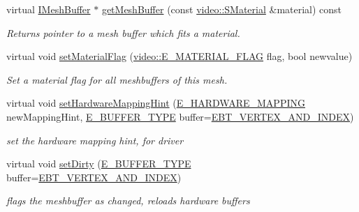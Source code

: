 \begin{DoxyCompactItemize}
virtual \hyperlink{classirr_1_1scene_1_1IMeshBuffer}{I\+Mesh\+Buffer} $\ast$ \hyperlink{structirr_1_1scene_1_1SAnimatedMesh_a3c010c881f315e56a05f40632f3c7f79}{get\+Mesh\+Buffer} (const \hyperlink{classirr_1_1video_1_1SMaterial}{video\+::\+S\+Material} \&material) const
\begin{DoxyCompactList}\small\item\em Returns pointer to a mesh buffer which fits a material. \end{DoxyCompactList}\item 
\mbox{\label{structirr_1_1scene_1_1SAnimatedMesh_aefe38066b9c38c6d4ea522b5d988769e}} 
virtual void \hyperlink{structirr_1_1scene_1_1SAnimatedMesh_aefe38066b9c38c6d4ea522b5d988769e}{set\+Material\+Flag} (\hyperlink{namespaceirr_1_1video_a8a3bc00ae8137535b9fbc5f40add70d3}{video\+::\+E\+\_\+\+M\+A\+T\+E\+R\+I\+A\+L\+\_\+\+F\+L\+AG} flag, bool newvalue)
\begin{DoxyCompactList}\small\item\em Set a material flag for all meshbuffers of this mesh. \end{DoxyCompactList}\item 
\mbox{\label{structirr_1_1scene_1_1SAnimatedMesh_a69448fa91bd1c6316d11d9ae3b8b88e6}} 
virtual void \hyperlink{structirr_1_1scene_1_1SAnimatedMesh_a69448fa91bd1c6316d11d9ae3b8b88e6}{set\+Hardware\+Mapping\+Hint} (\hyperlink{namespaceirr_1_1scene_ac7d8ee8d77da75f2580bb9bb17231c27}{E\+\_\+\+H\+A\+R\+D\+W\+A\+R\+E\+\_\+\+M\+A\+P\+P\+I\+NG} new\+Mapping\+Hint, \hyperlink{namespaceirr_1_1scene_a8f59a89ffef0ad8e5b2c2cb874a93e8c}{E\+\_\+\+B\+U\+F\+F\+E\+R\+\_\+\+T\+Y\+PE} buffer=\hyperlink{namespaceirr_1_1scene_a8f59a89ffef0ad8e5b2c2cb874a93e8ca34ea664123fbc28610408e51b014dcdd}{E\+B\+T\+\_\+\+V\+E\+R\+T\+E\+X\+\_\+\+A\+N\+D\+\_\+\+I\+N\+D\+EX})
\begin{DoxyCompactList}\small\item\em set the hardware mapping hint, for driver \end{DoxyCompactList}\item 
\mbox{\label{structirr_1_1scene_1_1SAnimatedMesh_a415b9404cee43f2f460ebb32724d7793}} 
virtual void \hyperlink{structirr_1_1scene_1_1SAnimatedMesh_a415b9404cee43f2f460ebb32724d7793}{set\+Dirty} (\hyperlink{namespaceirr_1_1scene_a8f59a89ffef0ad8e5b2c2cb874a93e8c}{E\+\_\+\+B\+U\+F\+F\+E\+R\+\_\+\+T\+Y\+PE} buffer=\hyperlink{namespaceirr_1_1scene_a8f59a89ffef0ad8e5b2c2cb874a93e8ca34ea664123fbc28610408e51b014dcdd}{E\+B\+T\+\_\+\+V\+E\+R\+T\+E\+X\+\_\+\+A\+N\+D\+\_\+\+I\+N\+D\+EX})
\begin{DoxyCompactList}\small\item\em flags the meshbuffer as changed, reloads hardware buffers \end{DoxyCompactList}\end{DoxyCompactItemize}
